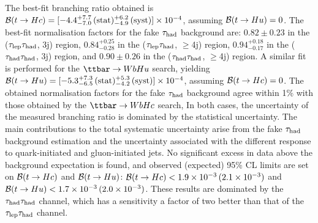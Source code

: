 The best-fit branching ratio obtained is $\mathcal{B}(t\to Hc)=[-4.4^{+7.7}_{-7.0}\,(\mathrm{stat})^{+6.2}_{-4.9}\,(\mathrm{syst})] \times 10^{-4}$, assuming $\mathcal{B}(t\to Hu)=0$. 
The best-fit normalisation factors for the fake $\tau_{\mathrm{had}}$ background are: $0.82 \pm 0.23$ in the ($\tau_{\mathrm{lep}} \tau_{\mathrm{had}}$, 3j) region, $0.84^{+0.25}_{-0.28}$ in the ($\tau_{\mathrm{lep}} \tau_{\mathrm{had}}$, $\geq$4j) region,
$0.94^{+0.18}_{-0.17}$ in the ($\tau_{\mathrm{had}} \tau_{\mathrm{had}}$, 3j) region, and $0.90 \pm 0.26$ in the ($\tau_{\mathrm{had}} \tau_{\mathrm{had}}$, $\geq$4j) region.
A similar fit is performed for the $\Hu$ search, yielding $\mathcal{B}(t\to Hu)=[-5.3^{+7.3}_{-6.5}\,(\mathrm{stat})^{+5.3}_{-4.2}\,(\mathrm{syst})] \times 10^{-4}$,
assuming $\mathcal{B}(t\to Hc)=0$. The obtained normalisation factors for the fake $\tau_{\mathrm{had}}$ background agree within 1\% with those obtained by the $\Hc$ search,
In both cases, the uncertainty of the measured branching ratio is dominated by the statistical uncertainty.
The main contributions to the total systematic uncertainty arise from the fake $\tau_{\mathrm{had}}$ background estimation and the uncertainty associated
with the different response to quark-initiated and gluon-initiated jets. 
No significant excess in data above the background expectation is found, 
and observed (expected) 95\% CL limits are set on $\mathcal{B}(t\to Hc)$ and $\mathcal{B}(t\to Hu)$:
$\mathcal{B}(t\to Hc)<1.9 \times 10^{-3}\,(2.1 \times 10^{-3})$ and $\mathcal{B}(t\to Hu)<1.7 \times 10^{-3}\,(2.0 \times 10^{-3})$.
These results are dominated by the $\tau_{\mathrm{had}} \tau_{\mathrm{had}}$ channel, which has a sensitivity a factor of two better than that of the $\tau_{\mathrm{lep}} \tau_{\mathrm{had}}$ channel.

